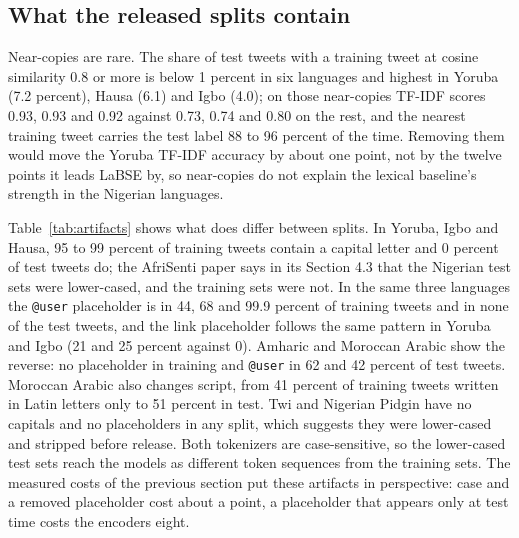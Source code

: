 \documentclass[11pt]{article}
\begin{document}
\subsection{What the released splits contain}
\label{sec:audit}
Near-copies are rare. The share of test tweets with a training tweet at cosine similarity 0.8 or more is below 1 percent in six languages and highest in Yoruba (7.2 percent), Hausa (6.1) and Igbo (4.0); on those near-copies TF-IDF scores 0.93, 0.93 and 0.92 against 0.73, 0.74 and 0.80 on the rest, and the nearest training tweet carries the test label 88 to 96 percent of the time. Removing them would move the Yoruba TF-IDF accuracy by about one point, not by the twelve points it leads LaBSE by, so near-copies do not explain the lexical baseline's strength in the Nigerian languages.

Table~\ref{tab:artifacts} shows what does differ between splits. In Yoruba, Igbo and Hausa, 95 to 99 percent of training tweets contain a capital letter and 0 percent of test tweets do; the AfriSenti paper says in its Section 4.3 that the Nigerian test sets were lower-cased, and the training sets were not. In the same three languages the \texttt{@user} placeholder is in 44, 68 and 99.9 percent of training tweets and in none of the test tweets, and the link placeholder follows the same pattern in Yoruba and Igbo (21 and 25 percent against 0). Amharic and Moroccan Arabic show the reverse: no placeholder in training and \texttt{@user} in 62 and 42 percent of test tweets. Moroccan Arabic also changes script, from 41 percent of training tweets written in Latin letters only to 51 percent in test. Twi and Nigerian Pidgin have no capitals and no placeholders in any split, which suggests they were lower-cased and stripped before release. Both tokenizers are case-sensitive, so the lower-cased test sets reach the models as different token sequences from the training sets. The measured costs of the previous section put these artifacts in perspective: case and a removed placeholder cost about a point, a placeholder that appears only at test time costs the encoders eight.
\end{document}
